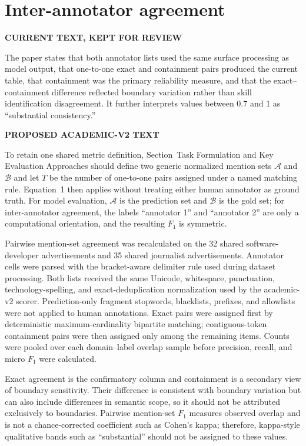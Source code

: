 \documentclass[11pt,a4paper]{article}
\newenvironment{OldBlock}
  {\definecolor{shadecolor}{RGB}{255,230,230}\begin{shaded}\begingroup\textbf{CURRENT TEXT, KEPT FOR REVIEW}\par\color{red!70!black}}
  {\endgroup\end{shaded}}
\newenvironment{NewBlock}
  {\definecolor{shadecolor}{RGB}{199,235,255}\begin{shaded}\begingroup\textbf{PROPOSED ACADEMIC-V2 TEXT}\par\color{newink}}
  {\endgroup\end{shaded}}
\begin{document}
\section{Inter-annotator agreement}
\begin{OldBlock}
The paper states that both annotator lists used the same surface processing as
model output, that one-to-one exact and containment pairs produced the current
table, that containment was the primary reliability measure, and that the
exact--containment difference reflected boundary variation rather than skill
identification disagreement. It further interprets values between 0.7 and 1 as
``substantial consistency.''
\end{OldBlock}
\begin{NewBlock}
To retain one shared metric definition, Section~\textnormal{Task Formulation
and Key Evaluation Approaches} should define two generic normalized mention
sets $\mathcal{A}$ and $\mathcal{B}$ and let $T$ be the number of
one-to-one pairs assigned under a named matching rule. Equation~\textnormal{1}
then applies without treating either human annotator as ground truth. For model
evaluation, $\mathcal{A}$ is the prediction set and $\mathcal{B}$ is the
gold set; for inter-annotator agreement, the labels ``annotator 1'' and
``annotator 2'' are only a computational orientation, and the resulting $F_1$
is symmetric.

Pairwise mention-set agreement was recalculated on the 32 shared
software-developer advertisements and 35 shared journalist advertisements.
Annotator cells were parsed with the bracket-aware delimiter rule used during
dataset processing. Both lists received the same Unicode, whitespace,
punctuation, technology-spelling, and exact-deduplication normalization used by
the academic-v2 scorer. Prediction-only fragment stopwords, blacklists,
prefixes, and allowlists were not applied to human annotations. Exact pairs
were assigned first by deterministic maximum-cardinality bipartite matching;
contiguous-token containment pairs were then assigned only among the remaining
items. Counts were pooled over each domain--label overlap sample before
precision, recall, and micro $F_1$ were calculated.

Exact agreement is the confirmatory column and containment is a secondary view
of boundary sensitivity. Their difference is consistent with boundary
variation but can also include differences in semantic scope, so it should not
be attributed exclusively to boundaries. Pairwise mention-set $F_1$ measures
observed overlap and is not a chance-corrected coefficient such as Cohen's
kappa; therefore, kappa-style qualitative bands such as ``substantial'' should
not be assigned to these values.
\end{NewBlock}
\end{document}
